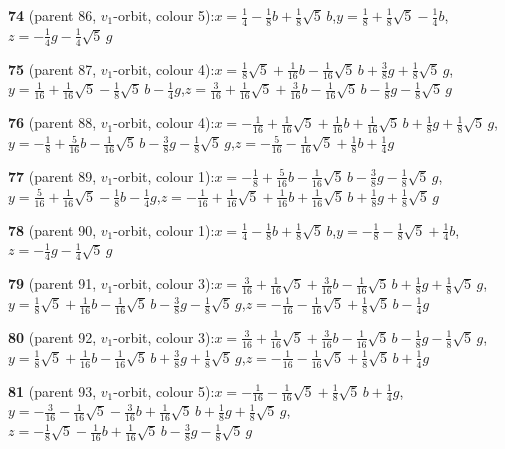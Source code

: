 \documentclass[10pt]{article}
\begin{document}
{\noindent\textbf{74} (parent 86, $v_1$-orbit, colour 5):\quad $x=\tfrac{1}{4}-\tfrac{1}{8}b+\tfrac{1}{8}\sqrt5\,b$,\quad $y=\tfrac{1}{8}+\tfrac{1}{8}\sqrt5-\tfrac{1}{4}b$,\quad $z=-\tfrac{1}{4}g-\tfrac{1}{4}\sqrt5\,g$\par\smallskip
\noindent\textbf{75} (parent 87, $v_1$-orbit, colour 4):\quad $x=\tfrac{1}{8}\sqrt5+\tfrac{1}{16}b-\tfrac{1}{16}\sqrt5\,b+\tfrac{3}{8}g+\tfrac{1}{8}\sqrt5\,g$,\quad $y=\tfrac{1}{16}+\tfrac{1}{16}\sqrt5-\tfrac{1}{8}\sqrt5\,b-\tfrac{1}{4}g$,\quad $z=\tfrac{3}{16}+\tfrac{1}{16}\sqrt5+\tfrac{3}{16}b-\tfrac{1}{16}\sqrt5\,b-\tfrac{1}{8}g-\tfrac{1}{8}\sqrt5\,g$\par\smallskip
\noindent\textbf{76} (parent 88, $v_1$-orbit, colour 4):\quad $x=-\tfrac{1}{16}+\tfrac{1}{16}\sqrt5+\tfrac{1}{16}b+\tfrac{1}{16}\sqrt5\,b+\tfrac{1}{8}g+\tfrac{1}{8}\sqrt5\,g$,\quad $y=-\tfrac{1}{8}+\tfrac{5}{16}b-\tfrac{1}{16}\sqrt5\,b-\tfrac{3}{8}g-\tfrac{1}{8}\sqrt5\,g$,\quad $z=-\tfrac{5}{16}-\tfrac{1}{16}\sqrt5+\tfrac{1}{8}b+\tfrac{1}{4}g$\par\smallskip
\noindent\textbf{77} (parent 89, $v_1$-orbit, colour 1):\quad $x=-\tfrac{1}{8}+\tfrac{5}{16}b-\tfrac{1}{16}\sqrt5\,b-\tfrac{3}{8}g-\tfrac{1}{8}\sqrt5\,g$,\quad $y=\tfrac{5}{16}+\tfrac{1}{16}\sqrt5-\tfrac{1}{8}b-\tfrac{1}{4}g$,\quad $z=-\tfrac{1}{16}+\tfrac{1}{16}\sqrt5+\tfrac{1}{16}b+\tfrac{1}{16}\sqrt5\,b+\tfrac{1}{8}g+\tfrac{1}{8}\sqrt5\,g$\par\smallskip
\noindent\textbf{78} (parent 90, $v_1$-orbit, colour 1):\quad $x=\tfrac{1}{4}-\tfrac{1}{8}b+\tfrac{1}{8}\sqrt5\,b$,\quad $y=-\tfrac{1}{8}-\tfrac{1}{8}\sqrt5+\tfrac{1}{4}b$,\quad $z=-\tfrac{1}{4}g-\tfrac{1}{4}\sqrt5\,g$\par\smallskip
\noindent\textbf{79} (parent 91, $v_1$-orbit, colour 3):\quad $x=\tfrac{3}{16}+\tfrac{1}{16}\sqrt5+\tfrac{3}{16}b-\tfrac{1}{16}\sqrt5\,b+\tfrac{1}{8}g+\tfrac{1}{8}\sqrt5\,g$,\quad $y=\tfrac{1}{8}\sqrt5+\tfrac{1}{16}b-\tfrac{1}{16}\sqrt5\,b-\tfrac{3}{8}g-\tfrac{1}{8}\sqrt5\,g$,\quad $z=-\tfrac{1}{16}-\tfrac{1}{16}\sqrt5+\tfrac{1}{8}\sqrt5\,b-\tfrac{1}{4}g$\par\smallskip
\noindent\textbf{80} (parent 92, $v_1$-orbit, colour 3):\quad $x=\tfrac{3}{16}+\tfrac{1}{16}\sqrt5+\tfrac{3}{16}b-\tfrac{1}{16}\sqrt5\,b-\tfrac{1}{8}g-\tfrac{1}{8}\sqrt5\,g$,\quad $y=\tfrac{1}{8}\sqrt5+\tfrac{1}{16}b-\tfrac{1}{16}\sqrt5\,b+\tfrac{3}{8}g+\tfrac{1}{8}\sqrt5\,g$,\quad $z=-\tfrac{1}{16}-\tfrac{1}{16}\sqrt5+\tfrac{1}{8}\sqrt5\,b+\tfrac{1}{4}g$\par\smallskip
\noindent\textbf{81} (parent 93, $v_1$-orbit, colour 5):\quad $x=-\tfrac{1}{16}-\tfrac{1}{16}\sqrt5+\tfrac{1}{8}\sqrt5\,b+\tfrac{1}{4}g$,\quad $y=-\tfrac{3}{16}-\tfrac{1}{16}\sqrt5-\tfrac{3}{16}b+\tfrac{1}{16}\sqrt5\,b+\tfrac{1}{8}g+\tfrac{1}{8}\sqrt5\,g$,\quad $z=-\tfrac{1}{8}\sqrt5-\tfrac{1}{16}b+\tfrac{1}{16}\sqrt5\,b-\tfrac{3}{8}g-\tfrac{1}{8}\sqrt5\,g$\par\smallskip
}
\end{document}
